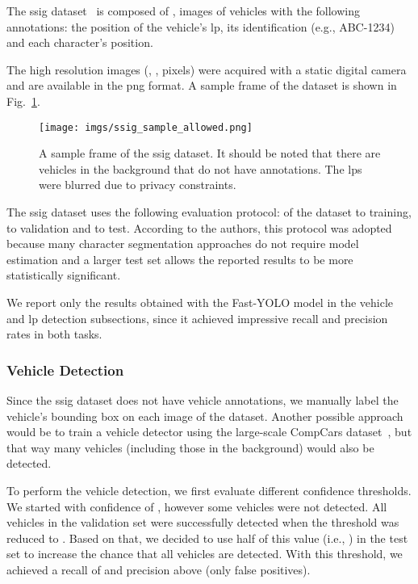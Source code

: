 The \gls*{ssig} dataset~\cite{goncalves2016benchmark} is composed of , images of  vehicles with the following annotations: the position of the vehicle's \gls*{lp}, its identification (e.g., ABC-1234) and each character's position.

The high resolution images (,  , pixels) were acquired with a static digital camera and are available in the \gls*{png} format. A sample frame of the dataset is shown in Fig.~\ref{fig:ssig_sample}.

\begin{figure}[!htb]
	\centering
 	\texttt{[image: imgs/ssig\_sample\_allowed.png]}
	\caption{A sample frame of the \gls*{ssig} dataset. It should be noted that there are vehicles in the background that do not have annotations. The \glspl*{lp} were blurred due to privacy constraints.}
	\label{fig:ssig_sample}    
\end{figure}

The \gls*{ssig} dataset uses the following evaluation protocol:  of the dataset to training,  to validation and  to test. According to the authors, this protocol was adopted because many character segmentation approaches do not require model estimation and a larger test set allows the reported results to be more statistically significant.

We report only the results obtained with the Fast-YOLO model in the vehicle and \gls*{lp} detection subsections, since it achieved impressive recall and precision rates in both tasks.

\subsubsection{Vehicle Detection}
Since the \gls*{ssig} dataset does not have vehicle annotations, we manually label the vehicle's bounding box on each image of the dataset. Another possible approach would be to train a vehicle detector using the large-scale CompCars dataset~\cite{yang2015}, but that way many vehicles (including those in the background) would also be detected. 

To perform the vehicle detection, we first evaluate different confidence thresholds. We started with confidence of , however some vehicles were not detected. All  vehicles in the validation set were successfully detected when the threshold was reduced to . Based on that, we decided to use half of this value (i.e., ) in the test set to increase the chance that all vehicles are detected. With this threshold, we achieved a recall of  and precision above  (only  false positives). 

